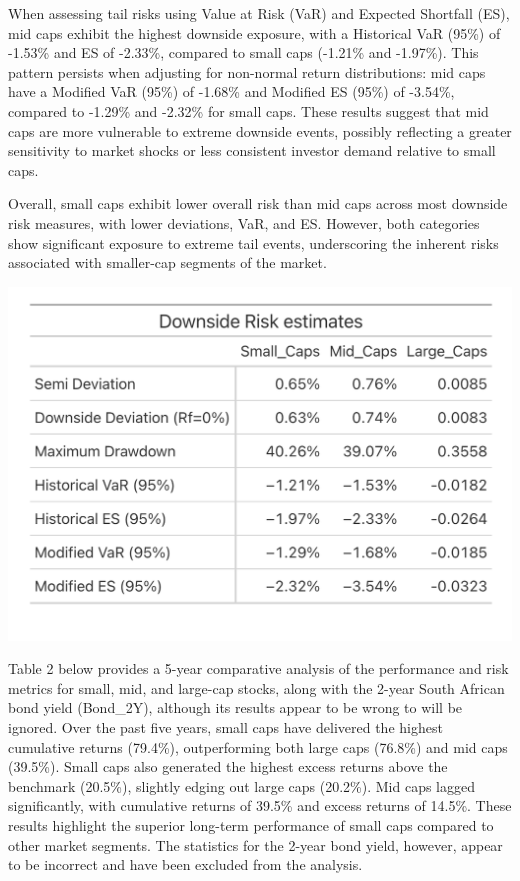 \documentclass[12pt,preprint]{elsarticle}
\let\origfigure\figure
\let\endorigfigure\endfigure
\renewenvironment{figure}[1][2] {
    \expandafter\origfigure\expandafter[H]
} {
    \endorigfigure
}
\numberwithin{equation}{section}
\numberwithin{figure}{section}
\numberwithin{table}{section}
\begin{document}
When assessing tail risks using Value at Risk (VaR) and Expected
Shortfall (ES), mid caps exhibit the highest downside exposure, with a
Historical VaR (95\%) of -1.53\% and ES of -2.33\%, compared to small
caps (-1.21\% and -1.97\%). This pattern persists when adjusting for
non-normal return distributions: mid caps have a Modified VaR (95\%) of
-1.68\% and Modified ES (95\%) of -3.54\%, compared to -1.29\% and
-2.32\% for small caps. These results suggest that mid caps are more
vulnerable to extreme downside events, possibly reflecting a greater
sensitivity to market shocks or less consistent investor demand relative
to small caps.

Overall, small caps exhibit lower overall risk than mid caps across most
downside risk measures, with lower deviations, VaR, and ES. However,
both categories show significant exposure to extreme tail events,
underscoring the inherent risks associated with smaller-cap segments of
the market.

\begin{figure}[H]

{\centering \includegraphics[width=0.8\linewidth]{tables/downside} 

}

\caption{Table 1: Risk Measures \label{tab:Table1}}\label{fig:Table1}
\end{figure}

Table 2 below provides a 5-year comparative analysis of the performance
and risk metrics for small, mid, and large-cap stocks, along with the
2-year South African bond yield (Bond\_2Y), although its results appear
to be wrong to will be ignored. Over the past five years, small caps
have delivered the highest cumulative returns (79.4\%), outperforming
both large caps (76.8\%) and mid caps (39.5\%). Small caps also
generated the highest excess returns above the benchmark (20.5\%),
slightly edging out large caps (20.2\%). Mid caps lagged significantly,
with cumulative returns of 39.5\% and excess returns of 14.5\%. These
results highlight the superior long-term performance of small caps
compared to other market segments. The statistics for the 2-year bond
yield, however, appear to be incorrect and have been excluded from the
analysis.
\end{document}
